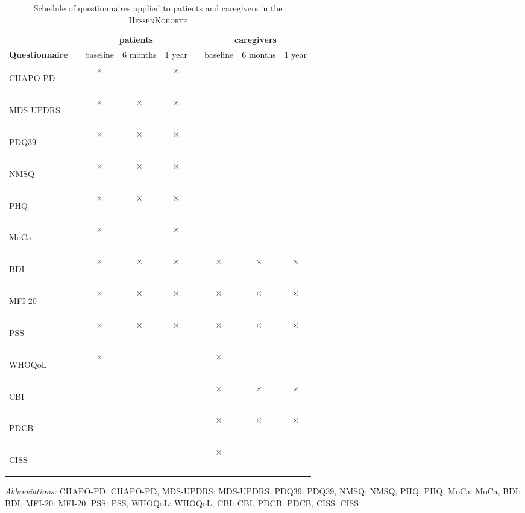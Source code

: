 \newcommand{\FC}{$\times$}
\newcommand{\emC}{}
\newcommand{\acb}[1]{\acs{#1}: \acl{#1}}
\newcommand{\acv}[1]{\begin{NoHyper}\acs{#1}\end{NoHyper}}
\begin{table}[]
\begin{tabular}{lcccccccc}
\caption{Schedule of questionnaires applied to patients and caregivers in the \textsc{HessenKohorte}}\label{tab:questionnaireSchedule}\\
\textbf{} & & \multicolumn{3}{c}{\textbf{patients}} & & \multicolumn{3}{c}{\textbf{caregivers}} \\[1em]
\textbf{Questionnaire}& & baseline & 6 months & 1 year  & & baseline & 6 months & 1 year \\[1em]
\acv{CHAPO-PD}              & & \FC{}        & \emC{}       & \FC{}       & & \emC{}        & \emC{}        & \emC{}      \\
\acv{MDS-UPDRS}             & & \FC{}        & \FC{}        & \FC{}       & & \emC{}        & \emC{}        & \emC{}      \\
\acv{PDQ39}                 & & \FC{}        & \FC{}        & \FC{}       & & \emC{}        & \emC{}        & \emC{}      \\
\acv{NMSQ}                  & & \FC{}        & \FC{}        & \FC{}       & & \emC{}        & \emC{}        & \emC{}      \\
\acv{PHQ}                   & & \FC{}        & \FC{}        & \FC{}       & & \emC{}        & \emC{}        & \emC{}      \\
\acv{MoCa}                  & & \FC{}        & \emC{}       & \FC{}       & & \emC{}        & \emC{}        & \emC{}      \\
\acv{BDI}                   & & \FC{}        & \FC{}        & \FC{}       & & \FC{}         & \FC{}         & \FC{}       \\
\acv{MFI-20}                & & \FC{}        & \FC{}        & \FC{}       & & \FC{}         & \FC{}         & \FC{}       \\
\acv{PSS}                   & & \FC{}        & \FC{}        & \FC{}       & & \FC{}         & \FC{}         & \FC{}       \\ 
\acv{WHOQoL}                & & \FC{}        & \emC{}       & \emC{}      & & \FC{}         & \emC{}        & \emC{}      \\
\acv{CBI}                   & & \emC{}       & \emC{}       & \emC{}      & & \FC{}         & \FC{}         & \FC{}       \\
\acv{PDCB}                  & & \emC{}       & \emC{}       & \emC{}      & & \FC{}         & \FC{}         & \FC{}       \\                              
\acv{CISS}                  & & \emC{}       & \emC{}       & \emC{}      & & \FC{}         & \emC{}        & \emC{}
\end{tabular}

\bigskip
\footnotesize{\textit{Abbreviations:} \acb{CHAPO-PD}, \acb{MDS-UPDRS}, \acb{PDQ39}, \acb{NMSQ}, \acb{PHQ},
\acb{MoCa}, \acb{BDI}, \acb{MFI-20}, \acb{PSS}, \acb{WHOQoL}, \acb{CBI}, \acb{PDCB}, \acb{CISS}}
\end{table}

